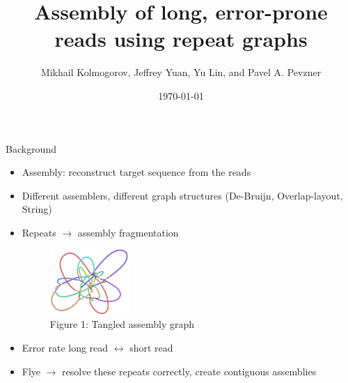 \documentclass{beamer}
\title{Assembly of long, error-prone reads using repeat graphs}
\date{\today}
\author{Mikhail Kolmogorov, Jeffrey Yuan, Yu Lin, and Pavel A. Pevzner}
\institute{Johannes Hausmann, Luis Kress}
\begin{document}
  \maketitle
  
  
  \begin{frame}{Background}
    \begin{itemize}[<+- | alert@+>]
      \item Assembly: reconstruct target sequence from the reads

      \item Different assemblers, different graph structures (De-Bruijn, Overlap-layout, String)

      \item Repeats $\rightarrow$ assembly fragmentation
      \begin{figure}
        \includegraphics[width=3cm]{presentation/images/tangled.png}
        \caption{Figure 1: Tangled assembly graph\cite{kolmogorov_assembly_2019}}
        \label{fig:tangled}
      \end{figure}

      \item Error rate long read $\leftrightarrow$ short read

      \item Flye $\rightarrow$ resolve these repeats correctly, create contiguous assemblies
    \end{itemize}
  \end{frame}

\end{document}
